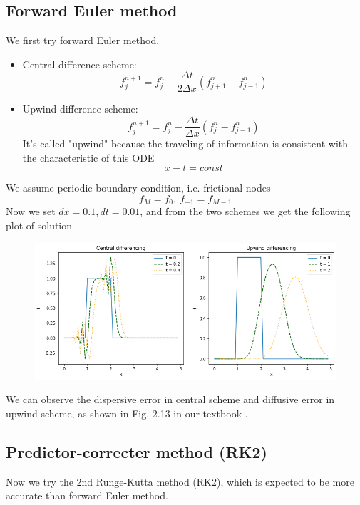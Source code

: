 \documentclass{article}
\begin{document}
\subsection{Forward Euler method}
We first try forward Euler method.
\begin{itemize}
\item Central difference scheme:
$$f_j^{n+1}=f_j^n-\frac{\Delta t}{2\Delta x}(f_{j+1}^n-f_{j-1}^n)$$
\item Upwind difference scheme:
$$f_j^{n+1}=f_j^n-\frac{\Delta t}{\Delta x}(f_{j}^n-f_{j-1}^n)$$
It's called "upwind" because the traveling of information is consistent with the characteristic of this ODE 
$$x-t=const$$
\end{itemize}
We assume periodic boundary condition, i.e. frictional nodes
$$f_M=f_0,\ f_{-1}=f_{M-1}$$
Now we set $dx=0.1, dt=0.01$, and from the two schemes we get the following plot of solution
\begin{figure}[H]
    \centering
    \includegraphics[width = 15cm]{pictures/pic6.png}
\end{figure}
We can observe the dispersive error in central scheme and diffusive error in upwind scheme, as shown in Fig. 2.13 in our textbook \cite{kajishima2017computational}.

\subsection{Predictor-correcter method (RK2)}
Now we try the 2nd Runge-Kutta method (RK2), which is expected to be more accurate than forward Euler method.
\end{document}
